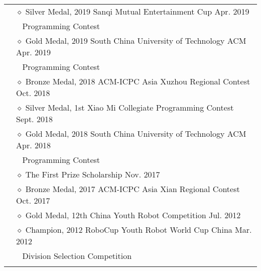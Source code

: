 \documentclass[letterpaper, 11pt]{article}
\begin{document}
\begin{longtable}{p{1.3in}p{4.8in}}
& $\diamond$ Silver Medal, 2019 Sanqi Mutual Entertainment Cup \hfill Apr. 2019 \\
& $\ \ $ Programming Contest \\

& $\diamond$ Gold Medal, 2019 South China University of Technology ACM \hfill Apr. 2019 \\
& $\ \ $ Programming Contest \\

& $\diamond$ Bronze Medal, 2018 ACM-ICPC Asia Xuzhou Regional Contest \hfill Oct. 2018 \\

& $\diamond$ Silver Medal, 1st Xiao Mi Collegiate Programming Contest \hfill Sept. 2018 \\

& $\diamond$ Gold Medal, 2018 South China University of Technology ACM \hfill Apr. 2018 \\
& $\ \ $ Programming Contest \\

& $\diamond$ The First Prize Scholarship \hfill Nov. 2017 \\

& $\diamond$ Bronze Medal, 2017 ACM-ICPC Asia Xian Regional Contest \hfill Oct. 2017 \\

& $\diamond$ Gold Medal, 12th China Youth Robot Competition \hfill Jul. 2012 \\

& $\diamond$ Champion, 2012 RoboCup Youth Robot World Cup China \hfill Mar. 2012 \\
& $\ \ $ Division Selection Competition \\

& \\






\end{longtable}
\end{document}
